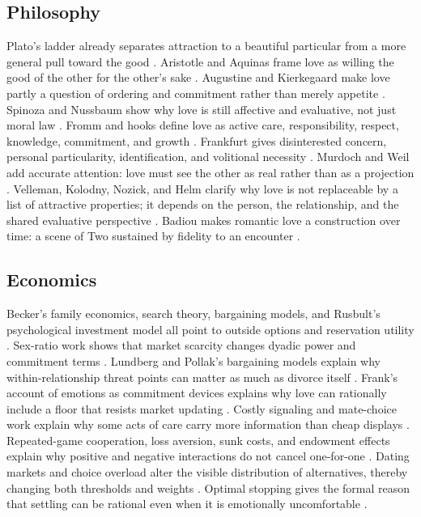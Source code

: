 \documentclass[11pt]{article}
\begin{document}
\subsection{Philosophy}
Plato's ladder already separates attraction to a beautiful particular from a more general pull toward the good \citep{plato1997}. Aristotle and Aquinas frame love as willing the good of the other for the other's sake \citep{aristotle1999,aquinas1947}. Augustine and Kierkegaard make love partly a question of ordering and commitment rather than merely appetite \citep{augustine1991,kierkegaard1995}. Spinoza and Nussbaum show why love is still affective and evaluative, not just moral law \citep{spinoza1994,nussbaum2001}. Fromm and hooks define love as active care, responsibility, respect, knowledge, commitment, and growth \citep{fromm1956,hooks2000}. Frankfurt gives disinterested concern, personal particularity, identification, and volitional necessity \citep{frankfurt2004}. Murdoch and Weil add accurate attention: love must see the other as real rather than as a projection \citep{murdoch1970,weil1951}. Velleman, Kolodny, Nozick, and Helm clarify why love is not replaceable by a list of attractive properties; it depends on the person, the relationship, and the shared evaluative perspective \citep{velleman1999,kolodny2003,nozick1989,helm2010}. Badiou makes romantic love a construction over time: a scene of Two sustained by fidelity to an encounter \citep{badiou2012}.

\subsection{Economics}
Becker's family economics, search theory, bargaining models, and Rusbult's psychological investment model all point to outside options and reservation utility \citep{becker1973,becker1981,mortensen1986,manser1980,mcelroy1981}. Sex-ratio work shows that market scarcity changes dyadic power and commitment terms \citep{guttentag1983,angrist2002}. Lundberg and Pollak's bargaining models explain why within-relationship threat points can matter as much as divorce itself \citep{lundberg1993,lundberg1996}. Frank's account of emotions as commitment devices explains why love can rationally include a floor that resists market updating \citep{frank1988}. Costly signaling and mate-choice work explain why some acts of care carry more information than cheap displays \citep{zahavi1975,miller2000}. Repeated-game cooperation, loss aversion, sunk costs, and endowment effects explain why positive and negative interactions do not cancel one-for-one \citep{axelrod1984,kahneman1979,thaler1980}. Dating markets and choice overload alter the visible distribution of alternatives, thereby changing both thresholds and weights \citep{rosenfeld2019,pronk2020}. Optimal stopping gives the formal reason that settling can be rational even when it is emotionally uncomfortable \citep{gilbert1966,bearden2006}.
\end{document}
